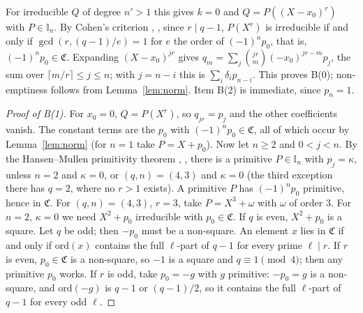 \documentclass[11pt,a4paper]{amsart}
\theoremstyle{remark}
\newcommand{\I}{\mathbb{I}}
\newcommand{\fC}{\mathfrak{C}}
\newcommand{\ord}{\mathrm{ord}}
\begin{document}
For irreducible $Q$ of degree $n'>1$ this gives $k=0$ and $Q=P((X-x_0)^r)$ with $P\in\I_n$. By Cohen's
criterion \cite{Co}, \cite[Theorem~3.2]{K}, since $r\mid q-1$, $P(X^r)$ is irreducible if and only if
$\gcd(r,(q-1)/e)=1$ for $e$ the order of $(-1)^np_0$, that is, $(-1)^np_0\in\fC$. Expanding
$(X-x_0)^{jr}$ gives $q_m=\sum_j\binom{jr}{m}(-x_0)^{jr-m}p_j$, the sum over $\lceil m/r\rceil\le j\le n$; with
$j=n-i$ this is $\sum_i\delta_ip_{n-i}$. This proves B(0); non-emptiness follows from Lemma~\ref{lem:norm}. Item
B(2) is immediate, since $p_n=1$.

\begin{proof}[Proof of B(1)]
For $x_0=0$, $Q=P(X^r)$, so $q_{jr}=p_j$ and the other coefficients vanish. The constant terms are the $p_0$
with $(-1)^np_0\in\fC$, all of which occur by Lemma~\ref{lem:norm} (for $n=1$ take $P=X+p_0$). Now let $n\ge2$ and
$0<j<n$. By the Hansen--Mullen primitivity theorem \cite{Co2,CP1,CP2}, \cite[Theorem~1.2]{K}, there is a
primitive $P\in\I_n$ with $p_j=\kappa$, unless $n=2$ and $\kappa=0$, or $(q,n)=(4,3)$ and $\kappa=0$ (the third
exception there has $q=2$, where no $r>1$ exists). A primitive $P$ has $(-1)^np_0$ primitive, hence in $\fC$.
For $(q,n)=(4,3)$, $r=3$, take $P=X^3+\omega$ with $\omega$ of order $3$. For $n=2$, $\kappa=0$ we need
$X^2+p_0$ irreducible with $p_0\in\fC$. If $q$ is even, $X^2+p_0$ is a square. Let $q$ be odd; then $-p_0$ must
be a non-square. An element $x$ lies in $\fC$ if and only if $\ord(x)$ contains the full $\ell$-part of $q-1$
for every prime $\ell\mid r$. If $r$ is even, $p_0\in\fC$ is a non-square, so $-1$ is a square and
$q\equiv1\pmod4$; then any primitive $p_0$ works. If $r$ is odd, take $p_0=-g$ with $g$ primitive: $-p_0=g$
is a non-square, and $\ord(-g)$ is $q-1$ or $(q-1)/2$, so it contains the full $\ell$-part of $q-1$ for every
odd $\ell$.
\end{proof}
\end{document}
